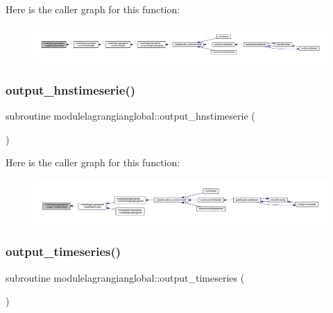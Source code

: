Here is the caller graph for this function\+:\nopagebreak
\begin{figure}[H]
\begin{center}
\leavevmode
\includegraphics[width=350pt]{namespacemodulelagrangianglobal_a30ffc99c4d1df3eba66898b8f54fd8e8_icgraph}
\end{center}
\end{figure}
\mbox{\label{namespacemodulelagrangianglobal_ae56aec86f2575e89f5bacc78d75192a8}} 
\subsubsection{\texorpdfstring{output\+\_\+hnstimeserie()}{output\_hnstimeserie()}}
{\footnotesize\ttfamily subroutine modulelagrangianglobal\+::output\+\_\+hnstimeserie (\begin{DoxyParamCaption}{ }\end{DoxyParamCaption})\hspace{0.3cm}{\ttfamily [private]}}

Here is the caller graph for this function\+:\nopagebreak
\begin{figure}[H]
\begin{center}
\leavevmode
\includegraphics[width=350pt]{namespacemodulelagrangianglobal_ae56aec86f2575e89f5bacc78d75192a8_icgraph}
\end{center}
\end{figure}
\mbox{\label{namespacemodulelagrangianglobal_a9965ea6d7045ff51397b7c8dcddf580c}} 
\subsubsection{\texorpdfstring{output\+\_\+timeseries()}{output\_timeseries()}}
{\footnotesize\ttfamily subroutine modulelagrangianglobal\+::output\+\_\+timeseries (\begin{DoxyParamCaption}{ }\end{DoxyParamCaption})\hspace{0.3cm}{\ttfamily [private]}}

